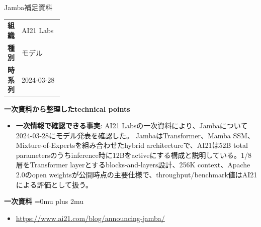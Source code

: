 \begin{technicalnote}{Jamba}{補足資料}
\begingroup
\begin{tabularx}{\linewidth}{@{}>{\bfseries}p{0.22\linewidth}X@{}}
組織 & AI21 Labs \\
種別 & モデル \\
時系列 & 2024-03-28 \\
\end{tabularx}
\smallskip
{\bfseries 一次資料から整理したtechnical points}
\begin{itemize}[leftmargin=1.5em,itemsep=0.35em]
\item \textbf{一次情報で確認できる事実}: AI21 Labsの一次資料により、Jambaについて2024-03-28にモデル発表を確認した。 JambaはTransformer、Mamba SSM、Mixture-of-Expertsを組み合わせたhybrid architectureで、AI21は52B total parametersのうちinference時に12Bをactiveにする構成と説明している。1/8層をTransformer layerとするblocks-and-layers設計、256K context、Apache 2.0のopen weightsが公開時点の主要仕様で、throughput/benchmark値はAI21による評価として扱う。
\end{itemize}
\begin{minipage}{\linewidth}
\begin{samepage}
{\bfseries 一次資料}
\begingroup\sloppy
\Urlmuskip=0mu plus 2mu\relax
\begin{itemize}[leftmargin=1.5em,itemsep=0.25em]
\item {\scriptsize\url{https://www.ai21.com/blog/announcing-jamba/}}
\end{itemize}
\endgroup
\end{samepage}
\end{minipage}
\endgroup
\end{technicalnote}
\medskip


